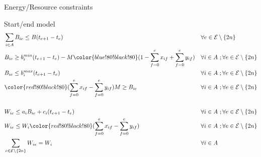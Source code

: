 \begin{frame}{Energy/Resource constraints}
  \begin{block}{Start/end model}
    {\footnotesize
      \begin{align*}
        &\sum_{i \in A} B_{ie} \le B(t_{e+1}- t_e) & & 
                                                       \forall e \in {\cal E}\setminus\{2n\}\\
        &B_{ie} \ge b_i^{min}(t_{e+1}-t_e) - M{\color{blue!80!black!80}(1 - \sum_{f=0}^e x_{if} +\sum_{f=0}^e y_{if})} & &
                                                                                                 \forall i \in A \ ;\forall e \in {\cal E}\setminus\{2n\} \\
        &B_{ie} \le b_i^{max} (t_{e+1} - t_e) & &
                                                  \forall i \in A \ ;\forall e \in {\cal E}\setminus\{2n\} \\
        &{\color{red!80!black!80}(\sum_{f=0}^{e} x_{if} - \sum_{f=0}^e y_{if})}M \ge B_{ie} & &
                                                                       \forall i \in A \ ;\forall e \in {\cal E}\setminus\{2n\}\\
 & & & \\
        &W_{ie} \le a_iB_{ie}+c_i(t_{e+1}-t_e) & &
                                                   \forall i \in A \ ;\forall e \in {\cal E} \setminus\{2n\}\\
        &W_{ie} \le W_i {\color{red!80!black!80}(\sum_{f=0}^{e} x_{if} -\sum_{f=0}^{e} y_{if})} & &
                                                                           \forall i \in A \ ;\forall e \in {\cal E}\setminus\{2n\} \\
        &\sum_{e\in {\cal E}\setminus\{2n\}} W_{ie} = W_i  & &
                                                               \forall i \in A 
\end{align*} }  
  \end{block}
  
\end{frame}

